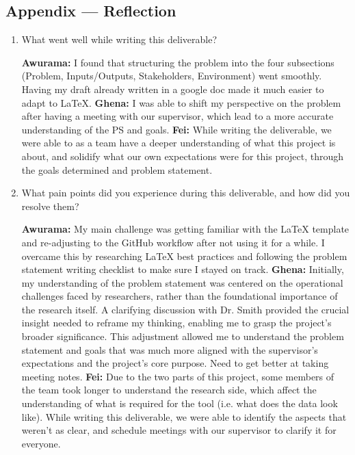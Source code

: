 \documentclass{article}
\begin{document}
\begin{itemize}
\begin{itemize}
\newpage{}

\section*{Appendix --- Reflection}


% 

\begin{enumerate}
    \item What went well while writing this deliverable? 
    
    \textbf{Awurama:} I found that structuring the problem into the four subsections 
    (Problem, Inputs/Outputs, Stakeholders, Environment) went smoothly. Having my 
    draft already written in a google doc made it much easier to adapt to LaTeX. 
    \textbf{Ghena:} I was able to shift my perspective on the problem after having a meeting with our supervisor, which lead to a more accurate understanding of the PS and goals.
    \textbf{Fei:} While writing the deliverable, we were able to as a team have a deeper understanding of what this project is about, and solidify what our own expectations were for this project, through the goals determined and problem statement.

    \item What pain points did you experience during this deliverable, and how
    did you resolve them?

    \textbf{Awurama:} My main challenge was getting familiar with the LaTeX template 
    and re-adjusting to the GitHub workflow after not using it for a while. I overcame this 
    by researching LaTeX best practices and following the problem statement writing checklist 
    to make sure I stayed on track.  
    \textbf{Ghena:} Initially, my understanding of the problem statement was centered on the operational challenges faced by researchers, rather than the foundational importance of the research itself. A clarifying discussion with Dr. Smith provided the crucial insight needed to reframe my thinking, enabling me to grasp the project's broader significance. This adjustment allowed me to understand the problem statement and goals that was much more aligned with the supervisor's expectations and the project's core purpose. Need to get better at taking meeting notes.
    \textbf{Fei:} Due to the two parts of this project, some members of the team took longer to understand the research side, which affect the understanding of what is required for the tool (i.e. what does the data look like). While writing this deliverable, we were able to identify the aspects that weren’t as clear, and schedule meetings with our supervisor to clarify it for everyone. 
    

\end{enumerate}
\end{itemize}
\end{itemize}
\end{document}
